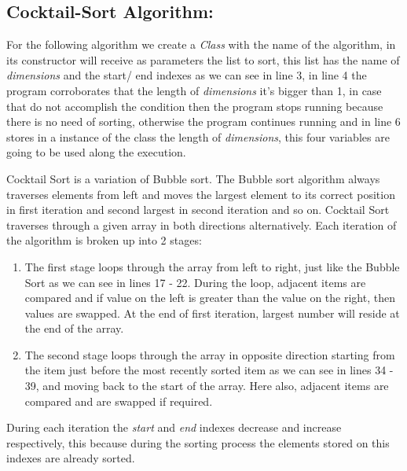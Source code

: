 \subsection{Cocktail-Sort Algorithm:}

For the following algorithm we create a {\itshape Class} with the name of the algorithm, in its constructor will receive as parameters the list to sort, this list has the name of {\itshape dimensions} and the start/ end indexes as we can see in line 3, in line 4 the program corroborates that the length of {\itshape dimensions} it's bigger than 1, in case that do not accomplish the condition then the program stops running because there is no need of sorting, otherwise the program continues running and in line 6 stores in a instance of the class the length of {\itshape dimensions}, this four variables are going to be used along the execution. \hfill \break

Cocktail Sort is a variation of Bubble sort. The Bubble sort algorithm always traverses elements from left and moves the largest element to its correct position in first iteration and second largest in second iteration and so on. Cocktail Sort traverses through a given array in both directions alternatively. Each iteration of the algorithm is broken up into 2 stages:

\begin{enumerate}
\item The first stage loops through the array from left to right, just like the Bubble Sort as we can see in lines 17 - 22. During the loop, adjacent items are compared and if value on the left is greater than the value on the right, then values are swapped. At the end of first iteration, largest number will reside at the end of the array.

\item The second stage loops through the array in opposite direction starting from the item just before the most recently sorted item as we can see in lines 34 - 39, and moving back to the start of the array. Here also, adjacent items are compared and are swapped if required. 
\end{enumerate}

During each iteration the {\itshape start} and {\itshape end} indexes decrease and increase respectively, this because during the sorting process the elements stored on this indexes are already sorted. \hfill \break

\pagebreak

